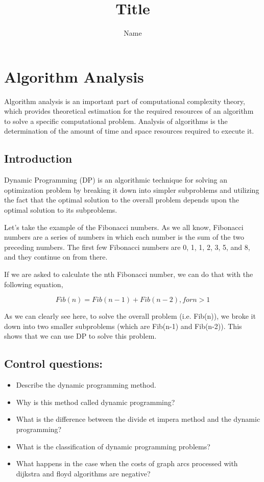 \documentclass[a4paper, 12pt]{article}
\author{Name}
\title{Title}
\begin{document}

\tableofcontents
\newpage

\section{Algorithm Analysis}

Algorithm analysis is an important part of computational complexity theory, which provides
theoretical estimation for the required resources of an algorithm to solve a specific computational problem. Analysis of algorithms is the determination of the amount of time and space
resources required to execute it.

\subsection{Introduction}

Dynamic Programming (DP) is an algorithmic technique for solving an
optimization problem by breaking it down into simpler subproblems
and utilizing the fact that the optimal solution to the overall problem
depends upon the optimal solution to its subproblems.

Let’s take the example of the Fibonacci numbers. As we all know,
Fibonacci numbers are a series of numbers in which each number is
the sum of the two preceding numbers. The first few
Fibonacci numbers are 0, 1, 1, 2, 3, 5, and 8, and they continue on from there.

If we are asked to calculate the nth Fibonacci number, we can do that with the following equation,

$$
      Fib(n) = Fib(n-1) + Fib(n-2), for n > 1
$$

As we can clearly see here, to solve the overall problem (i.e. Fib(n)), we broke it down into two smaller subproblems (which are Fib(n-1) and Fib(n-2)). This shows that we can use DP to solve this problem.


\subsection{Control questions:}

\begin{itemize}
      \item Describe the dynamic programming method.
      \item Why is this method called dynamic programming?
      \item What is the difference between the divide et impera method and the dynamic programming?
      \item What is the classification of dynamic programming problems?
      \item What happens in the case when the costs of graph arcs processed with dijkstra and floyd algorithms are negative?
\end{itemize}
\end{document}
